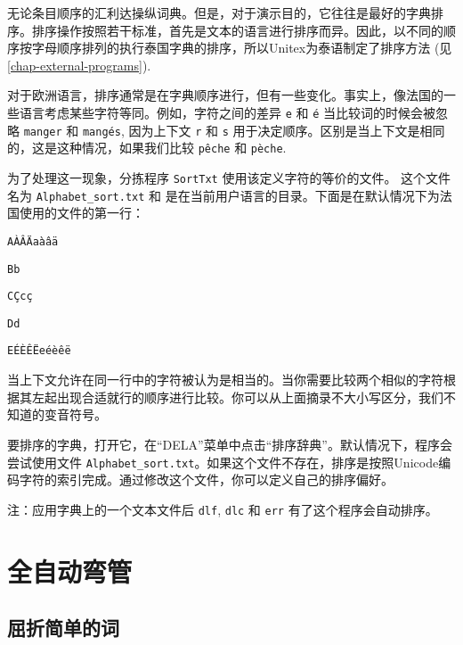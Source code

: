 无论条目顺序的汇利达操纵词典。但是，对于演示目的，它往往是最好的字典排序。排序操作按照若干标准，首先是文本的语言进行排序而异。因此，以不同的顺序按字母顺序排列的执行泰国字典的排序，所以Unitex为泰语制定了排序方法 (见
 \ref{chap-external-programs}).

\bigskip
\noindent 对于欧洲语言，排序通常是在字典顺序进行，但有一些变化。事实上，像法国的一些语言考虑某些字符等同。例如，字符之间的差异
\verb+e+ 和 \texttt{é} 当比较词的时候会被忽略 \verb+manger+ 和
\texttt{mangés}, 因为上下文 \verb+r+ 和 \verb+s+ 用于决定顺序。区别是当上下文是相同的，这是这种情况，如果我们比较 \texttt{pêche} 和 \texttt{pèche}.

\bigskip {}
\noindent
为了处理这一现象，分拣程序 \verb+SortTxt+  
 使用该定义字符的等价的文件。   这个文件名为
\verb+Alphabet_sort.txt+  和 是在当前用户语言的目录。下面是在默认情况下为法国使用的文件的第一行：


\bigskip
\noindent
\texttt{AÀÂÄaàâä}

\noindent
\texttt{Bb}

\noindent
\texttt{CÇcç}

\noindent
\texttt{Dd}

\noindent
\texttt{EÉÈÊËeéèêë}


\bigskip
\noindent 当上下文允许在同一行中的字符被认为是相当的。当你需要比较两个相似的字符根据其左起出现合适就行的顺序进行比较。你可以从上面摘录不大小写区分，我们不知道的变音符号。


\bigskip
\noindent 要排序的字典，打开它，在“DELA”菜单中点击“排序辞典”。默认情况下，程序会尝试使用文件 \verb+Alphabet_sort.txt+。如果这个文件不存在，排序是按照Unicode编码字符的索引完成。通过修改这个文件，你可以定义自己的排序偏好。


\bigskip
\noindent 注：应用字典上的一个文本文件后
\verb+dlf+, \verb+dlc+ 和 \verb+err+ 有了这个程序会自动排序。
 



\section{全自动弯管}
\label{section-automatic-inflection}
\subsection{屈折简单的词}

